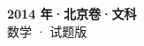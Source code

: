 \documentclass[zihao=-4, a4paper]{ctexart}
\begin{document}
\begin{center}
  {\Large\bfseries 2014 年·北京卷·文科}\\[4pt]
  {\large 数学 · 试题版}
\end{center}
\medskip
{}

\end{document}
